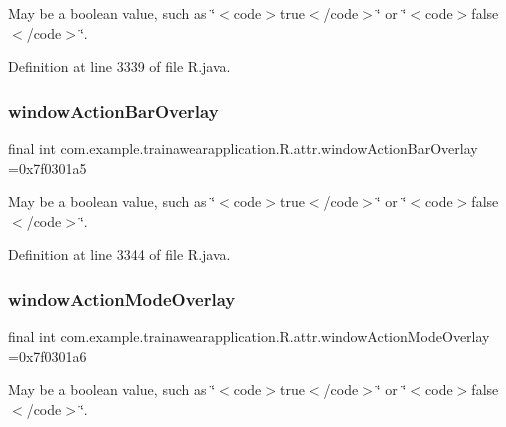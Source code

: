 May be a boolean value, such as \char`\"{}$<$code$>$true$<$/code$>$\char`\"{} or \char`\"{}$<$code$>$false$<$/code$>$\char`\"{}. 

Definition at line 3339 of file R.\+java.

\mbox{\label{classcom_1_1example_1_1trainawearapplication_1_1_r_1_1attr_a05622340ba01882c47f12c0a6528b343}} 
\subsubsection{\texorpdfstring{windowActionBarOverlay}{windowActionBarOverlay}}
{\footnotesize\ttfamily final int com.\+example.\+trainawearapplication.\+R.\+attr.\+window\+Action\+Bar\+Overlay =0x7f0301a5\hspace{0.3cm}{\ttfamily [static]}}

May be a boolean value, such as \char`\"{}$<$code$>$true$<$/code$>$\char`\"{} or \char`\"{}$<$code$>$false$<$/code$>$\char`\"{}. 

Definition at line 3344 of file R.\+java.

\mbox{\label{classcom_1_1example_1_1trainawearapplication_1_1_r_1_1attr_a3b26e19afb945bcd45ae3a91b2ae9627}} 
\subsubsection{\texorpdfstring{windowActionModeOverlay}{windowActionModeOverlay}}
{\footnotesize\ttfamily final int com.\+example.\+trainawearapplication.\+R.\+attr.\+window\+Action\+Mode\+Overlay =0x7f0301a6\hspace{0.3cm}{\ttfamily [static]}}

May be a boolean value, such as \char`\"{}$<$code$>$true$<$/code$>$\char`\"{} or \char`\"{}$<$code$>$false$<$/code$>$\char`\"{}. 

